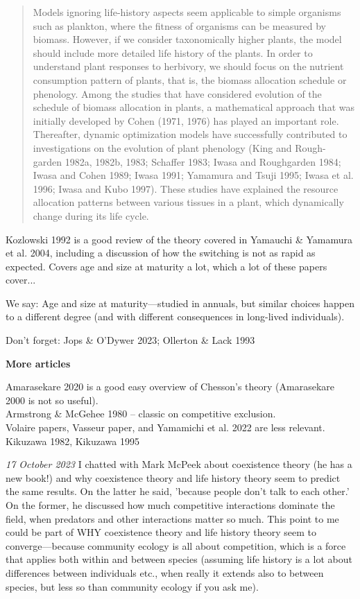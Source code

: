 \documentclass[11pt]{article}
\begin{document}
\begin{quote}
Models ignoring life-history aspects seem applicable to simple organisms such as plankton, where the fitness of organisms can be measured by biomass. However, if we consider taxonomically higher plants, the model should include more detailed life history of the plants. In order to understand plant responses to herbivory, we should focus on the nutrient consumption pattern of plants, that is, the biomass allocation schedule or phenology. Among the studies that have considered evolution of the schedule of biomass allocation in plants, a mathematical approach that was initially developed by Cohen (1971, 1976) has played an important role. Thereafter, dynamic optimization models have successfully contributed to investigations on the evolution of plant phenology (King and Rough- garden 1982a, 1982b, 1983; Schaffer 1983; Iwasa and Roughgarden 1984; Iwasa and Cohen 1989; Iwasa 1991; Yamamura and Tsuji 1995; Iwasa et al. 1996; Iwasa and Kubo 1997). These studies have explained the resource allocation patterns between various tissues in a plant, which dynamically change during its life cycle.
\end{quote}

Kozlowski 1992 is a good review of the theory covered in Yamauchi \& Yamamura et al. 2004, including a discussion of how the switching is not as rapid as expected. Covers age and size at maturity a lot, which a lot of these papers cover... 

We say: Age and size at maturity---studied in annuals, but similar choices happen to a different degree (and with different consequences in long-lived individuals). 

Don't forget: Jops \& O'Dywer 2023; Ollerton \& Lack 1993

{\bf More articles}

Amarasekare 2020 is a good easy overview of Chesson's theory (Amarasekare 2000 is not so useful). \\
Armstrong \& McGehee 1980 -- classic on competitive exclusion. \\
Volaire papers, Vasseur paper, and Yamamichi et al. 2022 are less relevant. \\
Kikuzawa 1982, Kikuzawa 1995


\emph{17 October 2023} I chatted with Mark McPeek about coexistence theory (he has a new book!) and why coexistence theory and life history theory seem to predict the same results. On the latter he said, 'because people don't talk to each other.' On the former, he discussed how much competitive interactions dominate the field, when predators and other interactions matter so much. This point to me could be part of WHY coexistence theory and life history theory seem to converge---because community ecology is all about competition, which is a force that applies both within and between species (assuming life history is a lot about differences between individuals etc., when really it extends also to between species, but less so than community ecology if you ask me). 
\end{document}
